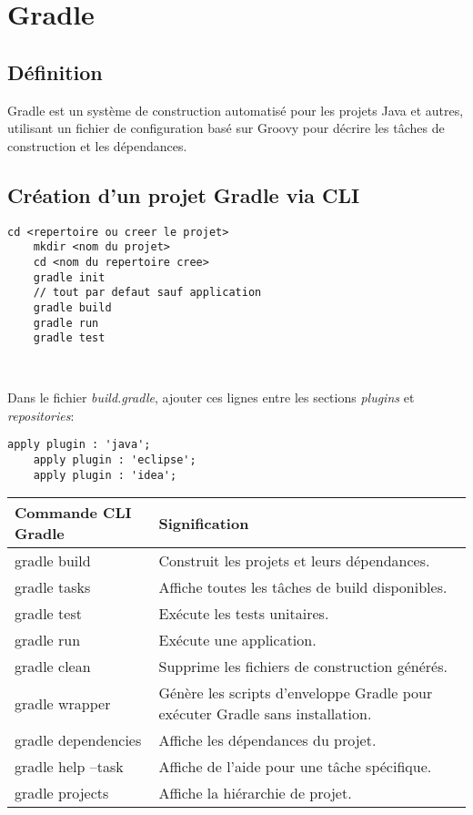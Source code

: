 \section{Gradle}\label{sec:gradle}
\subsection{D\'efinition}
\begin{definition}[Gradle]
	Gradle est un système de construction automatisé pour les projets Java et autres, utilisant un fichier de configuration basé sur Groovy pour décrire les tâches de construction et les dépendances.
\end{definition}

\subsection{Cr\'eation d'un projet Gradle via CLI}
\begin{lstlisting}[style=monstyle]
	cd <repertoire ou creer le projet>
	mkdir <nom du projet>
	cd <nom du repertoire cree>
	gradle init
	// tout par defaut sauf application
	gradle build
	gradle run
	gradle test
	
	
\end{lstlisting}

Dans le fichier \emph{build.gradle}, ajouter ces lignes entre les sections \emph{plugins} et \emph{repositories}:

\begin{lstlisting}[style=monstyle]
	apply plugin : 'java';
	apply plugin : 'eclipse';
	apply plugin : 'idea';
\end{lstlisting}

\begin{table}[H]
	\begin{tabular}{|l|l|}
		\toprule
		\textbf{Commande CLI Gradle} & \textbf{Signification} \\ \midrule
		gradle build & Construit les projets et leurs dépendances.\\
		gradle tasks & Affiche toutes les tâches de build disponibles. \\
		gradle test & Exécute les tests unitaires. \\
		gradle run & Exécute une application. \\
		gradle clean & Supprime les fichiers de construction générés. \\
		gradle wrapper & Génère les scripts d'enveloppe Gradle pour exécuter Gradle sans installation. \\
		gradle dependencies & Affiche les dépendances du projet. \\
		gradle help --task & Affiche de l'aide pour une tâche spécifique. \\
		gradle projects & Affiche la hiérarchie de projet. \\ \bottomrule
	\end{tabular}
\end{table}